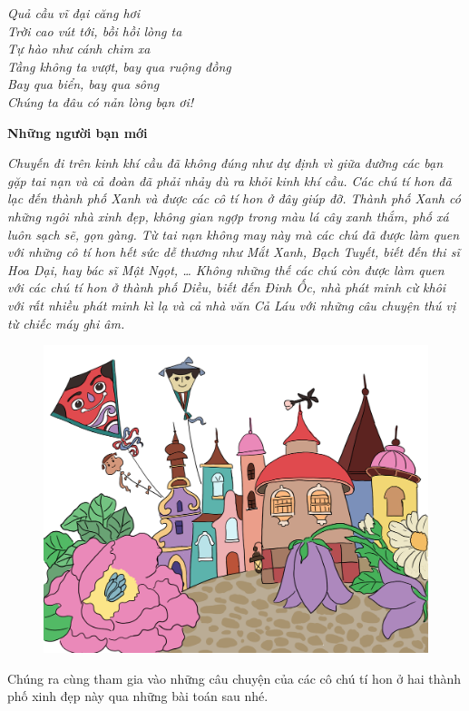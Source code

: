 	\begin{adjustwidth}{75pt}{0pt}
		\begin{flushleft}
			\textit{Quả cầu vĩ đại căng hơi\\
			Trời cao vút tới, bồi hồi lòng ta\\
			Tự hào như cánh chim xa\\
			Tầng không ta vượt, bay qua ruộng đồng\\
			Bay qua biển, bay qua sông\\
			Chúng ta đâu có nản lòng bạn ơi!}
		\end{flushleft}
	\end{adjustwidth}
	\begin{center}
		\textbf{\color{toancuabi}Những người bạn mới}
	\end{center}
	\textit{Chuyến đi trên kinh khí cầu đã không đúng như dự định vì giữa đường các bạn gặp tai nạn và cả đoàn đã phải nhảy dù ra khỏi kinh khí cầu. Các chú tí hon đã lạc đến thành phố Xanh và được các cô tí hon ở đây giúp đỡ. Thành phố Xanh có những ngôi nhà xinh đẹp, không gian ngợp trong màu lá cây xanh thắm, phố xá luôn sạch sẽ, gọn gàng. Từ tai nạn không may này mà các chú đã được làm quen với những cô tí hon hết sức dễ thương như Mắt Xanh, Bạch Tuyết, biết đến thi sĩ Hoa Dại, hay bác sĩ Mật Ngọt, …  Không những thế các chú còn được làm quen với các chú tí hon ở thành phố Diều, biết đến Đinh Ốc, nhà phát minh cừ khôi với rất nhiều phát minh kì lạ và cả nhà văn Cả Láu với những câu chuyện thú vị từ chiếc máy ghi âm.}
	\begin{figure}[H]
		\centering
		\vspace*{-5pt}
		\captionsetup{labelformat= empty, justification=centering}
		\includegraphics[width=0.5\linewidth]{Hinh11_ThanhPhoDieu}
		\vspace*{-10pt}
	\end{figure}	
	Chúng ra cùng tham gia vào những câu chuyện của các cô chú tí hon ở hai thành phố xinh đẹp này qua những bài toán sau nhé.
